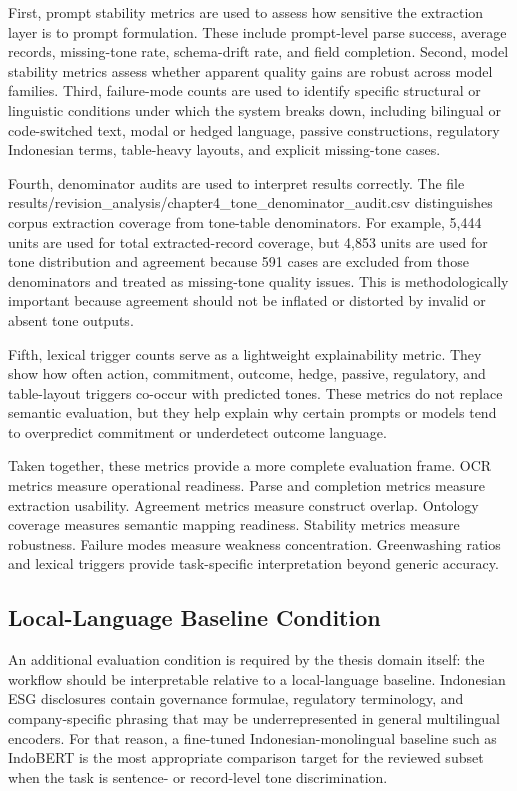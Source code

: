 \documentclass[english, online, cse, master]{dithesis}
\begin{document}
First, prompt stability metrics are used to assess how sensitive the extraction layer is to prompt formulation. These include prompt-level parse success, average records, missing-tone rate, schema-drift rate, and field completion. Second, model stability metrics assess whether apparent quality gains are robust across model families. Third, failure-mode counts are used to identify specific structural or linguistic conditions under which the system breaks down, including bilingual or code-switched text, modal or hedged language, passive constructions, regulatory Indonesian terms, table-heavy layouts, and explicit missing-tone cases.

Fourth, denominator audits are used to interpret results correctly. The file results/revision\_analysis/chapter4\_tone\_denominator\_audit.csv distinguishes corpus extraction coverage from tone-table denominators. For example, 5,444 units are used for total extracted-record coverage, but 4,853 units are used for tone distribution and agreement because 591 cases are excluded from those denominators and treated as missing-tone quality issues. This is methodologically important because agreement should not be inflated or distorted by invalid or absent tone outputs.

Fifth, lexical trigger counts serve as a lightweight explainability metric. They show how often action, commitment, outcome, hedge, passive, regulatory, and table-layout triggers co-occur with predicted tones. These metrics do not replace semantic evaluation, but they help explain why certain prompts or models tend to overpredict commitment or underdetect outcome language.

Taken together, these metrics provide a more complete evaluation frame. OCR metrics measure operational readiness. Parse and completion metrics measure extraction usability. Agreement metrics measure construct overlap. Ontology coverage measures semantic mapping readiness. Stability metrics measure robustness. Failure modes measure weakness concentration. Greenwashing ratios and lexical triggers provide task-specific interpretation beyond generic accuracy.

\subsection{Local-Language Baseline Condition}

An additional evaluation condition is required by the thesis domain itself: the workflow should be interpretable relative to a local-language baseline. Indonesian ESG disclosures contain governance formulae, regulatory terminology, and company-specific phrasing that may be underrepresented in general multilingual encoders. For that reason, a fine-tuned Indonesian-monolingual baseline such as IndoBERT is the most appropriate comparison target for the reviewed subset when the task is sentence- or record-level tone discrimination.
\end{document}
